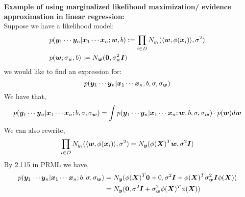 \begin{appendices}
\begin{question}
    \textbf{Example of using marginalized likelihood maximization/ evidence approximation in linear regression:} \\
    Suppose we have a likelihood model:
    \begin{align}
        &{} p(\bm{y}_{1} \cdots \bm{y}_{n} | \bm{x}_{1} \cdots \bm{x}_{n} ; \bm{w}, b) := \prod_{i \in D} N_{y_{i}} ( \langle \bm{w}, \phi(\bm{x}_{i}) \rangle, \sigma^{2}) \\
        & p(\bm{w} ; \sigma_{w} ,b) := N_{\bm{w}}(\bm{0},\sigma_{w}^{2} \bm{I})
    \end{align}
    we would like to find an expression for: 
    \begin{equation}
        p(\bm{y}_{1} \cdots \bm{y}_{n} | \bm{x}_{1} \cdots \bm{x}_{n} ; b, \sigma, \sigma_{\bm{w}})
    \end{equation}
    We have that,
    \begin{equation}
        p(\bm{y}_{1} \cdots \bm{y}_{n} | \bm{x}_{1} \cdots \bm{x}_{n} ; b, \sigma, \sigma_{\bm{w}}) = \int p(\bm{y}_{1} \cdots \bm{y}_{n} | \bm{x}_{1} \cdots \bm{x}_{n} ; \bm{w}, b, \sigma, \sigma_{\bm{w}}) \cdot p(\bm{w}) d\bm{w}
    \end{equation}
    We can also rewrite,
    \begin{equation}
        \prod_{i \in D} N_{y_{i}} ( \langle \bm{w}, \phi(\bm{x}_{i}) \rangle, \sigma^{2}) = N_{\bm{y}} (\phi(\bm{X})^{T} \bm{w}, \sigma^{2} \bm{I})
    \end{equation}
    By 2.115 in PRML we have,
    \begin{align}
        p(\bm{y}_{1} \cdots \bm{y}_{n} | \bm{x}_{1} \cdots \bm{x}_{n} ; b, \sigma, \sigma_{\bm{w}}) &{} = N_{\bm{y}}(\phi(\bm{X})^{T} \bm{0} + 0, \sigma^{2} \bm{I} + \phi(\bm{X})^{T} \sigma_{\bm{w}}^{2} \bm{I} \phi(\bm{X})) \\
        &= N_{\bm{y}}(\bm{0}, \sigma^{2} \bm{I} + \sigma_{\bm{w}}^{2} \phi(\bm{X})^{T} \phi(\bm{X}))
    \end{align}
\end{question}

\end{appendices}